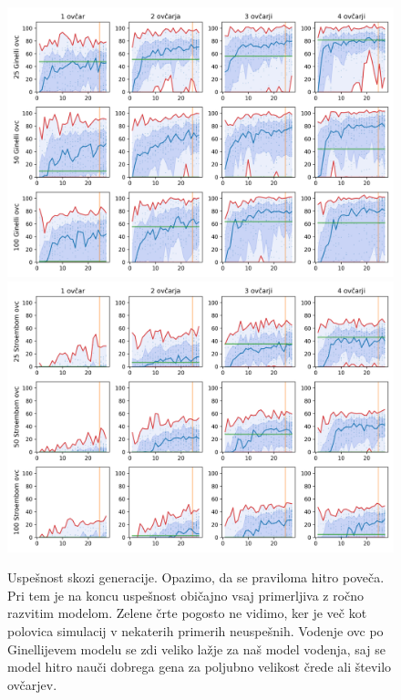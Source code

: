 \begin{figure}[H]  %
	\centering
	\includegraphics[height=0.4\textheight]{../poglavja/grafi/Ginelli-evolucija-Fitness.png}
	\includegraphics[height=0.4\textheight]{../poglavja/grafi/Stroembom-evolucija-Fitness.png}
	\caption[Uspešnost skozi generacije]{Uspešnost skozi generacije. Opazimo, da se praviloma hitro poveča. Pri tem je na koncu uspešnost običajno vsaj primerljiva z ročno razvitim modelom. Zelene črte pogosto ne vidimo, ker je več kot polovica simulacij v nekaterih primerih neuspešnih. Vodenje ovc po Ginellijevem modelu se zdi veliko lažje za naš model vodenja, saj se model hitro nauči dobrega gena za poljubno velikost črede ali število ovčarjev.} %
	\label{fig:fit}
\end{figure}

